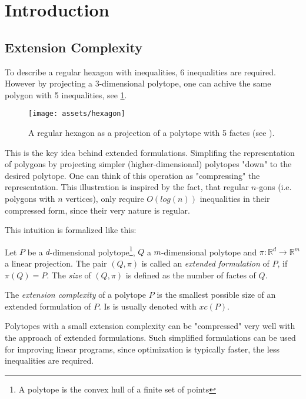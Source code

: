 \section{Introduction} 

\subsection{Extension Complexity}

To describe a regular hexagon with inequalities, 6 inequalities are required. However by projecting a 3-dimensional polytope, one can achive the same polygon with 5 inequalities, see \ref{fig:hexagon}. 

\begin{figure}[h]
  \centering
  \texttt{[image: assets/hexagon]}
  \caption{A regular hexagon as a projection of a polytope with 5 factes (see \cite{kwan2020extension}).}
  \label{fig:hexagon}
\end{figure}

This is the key idea behind extended formulations. Simplifing the representation of polygons by projecting simpler (higher-dimensional) polytopes "down" to the desired polytope.
One can think of this operation as "compressing" the representation. This illustration is inspired by the fact, that regular $n$-gons (i.e. polygons with $n$ vertices), only require $O(log(n))$ inequalities in their compressed form, since their very nature is regular.

This intuition is formalized like this:

\begin{definition}
  Let $P$ be a $d$-dimensional polytope\footnote{A polytope is the convex hull of a finite set of points}, $Q$ a $m$-dimensional polytope and $\pi:\mathbb{R}^d \to \mathbb{R}^m$ a linear projection.
  The pair $(Q,\pi)$ is called an \textit{extended formulation} of $P$, if $\pi(Q)=P$. The \textit{size} of $(Q,\pi)$ is defined as the number of factes of $Q$.
\end{definition}

\begin{definition}
  The \textit{extension complexity} of a polytope $P$ is the smallest possible size of an extended formulation of $P$. Is is usually denoted with $xc(P)$.
\end{definition}

Polytopes with a small extension complexity can be "compressed" very well with the approach of extended formulations.
Such simplified formulations can be used for improving linear programs, since optimization is typically faster, the less inequalities are required.

